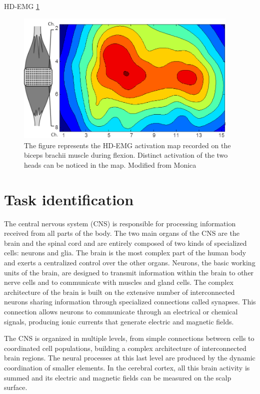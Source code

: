 HD-EMG \ref{fig:HD-EMG}

\begin{figure}[ht]
\centering
\includegraphics[width=0.95\textwidth]{Images/HD-EMG.png}
\caption{The figure represents the HD-EMG activation map recorded on the biceps brachii muscle during flexion. Distinct activation of the two heads can be noticed in the map. Modified from Monica}
\label{fig:HD-EMG}
\end{figure}


\section{Task identification}


The central nervous system (CNS) is responsible for processing information received from all parts of the body. The two main organs of the CNS are the brain and the spinal cord and are entirely composed of two kinds of specialized cells: neurons and glia. The brain is the most complex part of the human body and exerts a centralized control over the other organs. Neurons, the basic working units of the brain, are designed to transmit information within the brain to other nerve cells and to communicate with muscles and gland cells. The complex architecture of the brain is built on the extensive number of interconnected neurons sharing information through specialized connections called synapses. This connection allows  neurons to communicate through an electrical or chemical signals, producing ionic currents that generate electric and magnetic fields. 

The CNS is organized in multiple levels, from simple connections between cells to coordinated cell populations, building a complex architecture of interconnected brain regions. The neural processes at this last level are produced by the dynamic coordination of smaller elements. In the cerebral cortex, all this brain activity is summed and its electric and magnetic fields can be measured on the scalp surface. 



